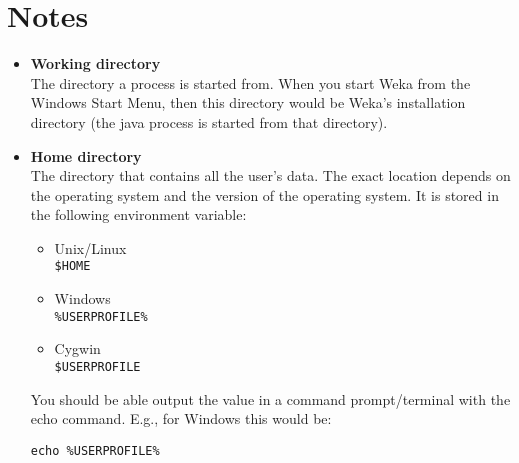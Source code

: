 \section*{Notes}
\begin{itemize}
 \item \textbf{Working directory} \\
  The directory a process is started from. When you start Weka from the Windows Start Menu, then this directory would be Weka's installation directory (the java process is started from that directory).
 \item \textbf{Home directory} \\
 The directory that contains all the user's data. The exact location depends on the operating system and the version of the operating system. It is stored in the following environment variable:
 \begin{itemize}
  \item Unix/Linux \\
  \texttt{\$HOME}
  \item Windows \\
   \texttt{\%USERPROFILE\%}
  \item Cygwin \\
    \texttt{\$USERPROFILE}
 \end{itemize}
  You should be able output the value in a command prompt/terminal with the echo command. E.g., for Windows this would be:

  \texttt{echo \%USERPROFILE\%}
\end{itemize}

